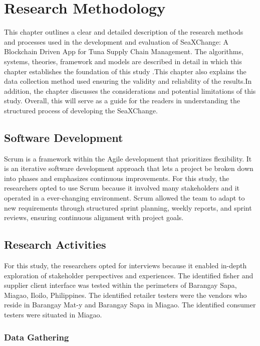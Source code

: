 \chapter{Research Methodology}
This chapter outlines a clear and detailed description of the research methods and processes used in the development and evaluation of SeaXChange: A Blockchain Driven App for Tuna Supply Chain Management. The algorithms, systems, theories, framework and models are described in detail in which this chapter establishes the foundation of this study .This chapter also explains the data collection method used ensuring the validity and reliability of the results.In addition, the chapter discusses the considerations and potential limitations of this study. Overall, this will serve as a guide for the readers in understanding the structured process of developing the SeaXChange.

\section{Software Development}
Scrum is a framework within the Agile development that prioritizes flexibility. It is an iterative software development approach that lets a project be broken down into phases and emphasizes continuous improvements. For this study, the researchers opted to use Scrum  because it involved many stakeholders and it operated in a ever-changing environment. Scrum allowed the team to adapt to new requirements through structured sprint planning, weekly reports, and sprint reviews, ensuring continuous alignment with project goals.
\section{Research Activities}
For this study, the researchers opted for interviews because it enabled in-depth exploration of stakeholder perspectives and experiences. 
The identified fisher and supplier client interface was tested within the perimeters of Barangay Sapa, Miagao, Iloilo, Philippines. The identified retailer testers were the vendors who reside in Barangay Mat-y and Barangay Sapa in Miagao. The identified consumer testers were situated in Miagao. 

\subsection{Data Gathering}

